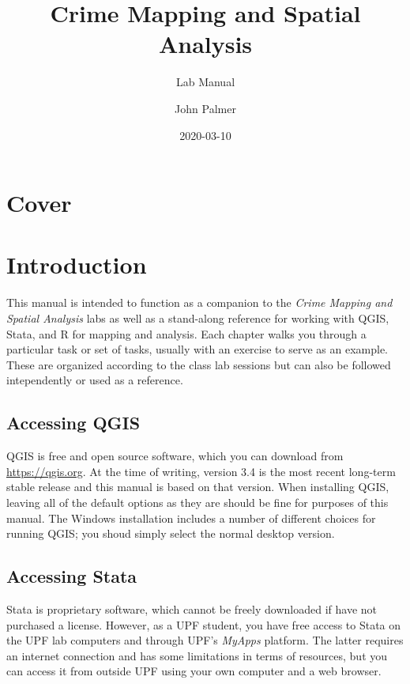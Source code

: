 \documentclass[]{book}
\title{Crime Mapping and Spatial Analysis}
\subtitle{Lab Manual}
\author{John Palmer}
\date{2020-03-10}
\begin{document}
\maketitle

{
\setcounter{tocdepth}{1}
\tableofcontents
}
\hypertarget{cover}{%
\chapter*{Cover}\label{cover}}

\hypertarget{introduction}{%
\chapter*{Introduction}\label{introduction}}

This manual is intended to function as a companion to the \emph{Crime Mapping and Spatial Analysis} labs as well as a stand-along reference for working with QGIS, Stata, and R for mapping and analysis. Each chapter walks you through a particular task or set of tasks, usually with an exercise to serve as an example. These are organized according to the class lab sessions but can also be followed intependently or used as a reference.

\hypertarget{accessing-qgis}{%
\section*{Accessing QGIS}\label{accessing-qgis}}

QGIS is free and open source software, which you can download from \url{https://qgis.org}. At the time of writing, version 3.4 is the most recent long-term stable release and this manual is based on that version. When installing QGIS, leaving all of the default options as they are should be fine for purposes of this manual. The Windows installation includes a number of different choices for running QGIS; you shoud simply select the normal desktop version.

\hypertarget{accessing-stata}{%
\section*{Accessing Stata}\label{accessing-stata}}

Stata is proprietary software, which cannot be freely downloaded if have not purchased a license. However, as a UPF student, you have free access to Stata on the UPF lab computers and through UPF's \emph{MyApps} platform. The latter requires an internet connection and has some limitations in terms of resources, but you can access it from outside UPF using your own computer and a web browser.
\end{document}
